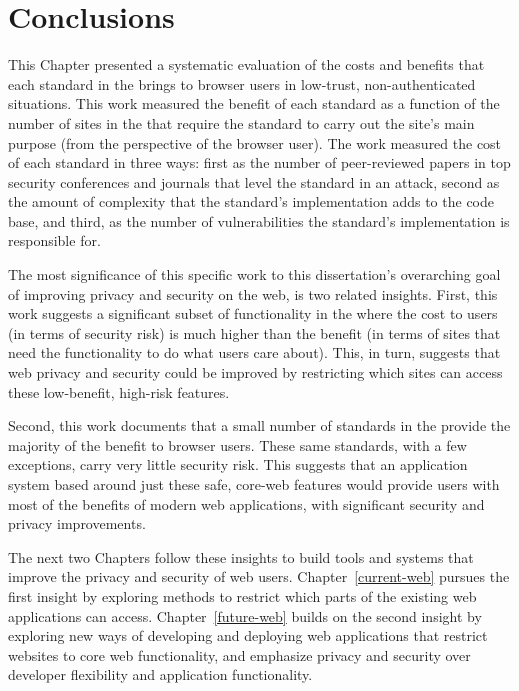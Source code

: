\section{Conclusions}
\label{cost-benefit:conclusions}

This Chapter presented a systematic evaluation of the costs and benefits that
each standard in the \WAPI brings to browser users in low-trust,
non-authenticated situations.  This work measured the benefit of each
standard as a function of the number of sites in the \ATK that require
the standard to carry out the site's main purpose (from the perspective
of the browser user).  The work measured the cost
of each standard in three ways: first as the number of peer-reviewed papers
in top security conferences and journals that level the standard in an attack,
second as the amount of complexity that the standard's implementation adds
to the code base, and third, as the number of vulnerabilities the standard's
implementation is responsible for.

The most significance of this specific work to this dissertation's
overarching goal of improving privacy and security on the web, is two
related insights.  First, this work suggests a significant
subset of functionality in the \WAPI where the cost to users (in terms of
security risk) is much higher than the benefit (in terms of sites that need the
functionality to do what users care about).  This, in turn, suggests that web
privacy and security could be improved by restricting which sites can access
these low-benefit, high-risk features.

Second, this work documents that a small number of standards in the \WAPI
provide the majority of the benefit to browser users.  These same standards,
with a few exceptions, carry very little security risk. This suggests
that an application system based around just these safe, core-web features
would provide users with most of the benefits of modern web applications, with
significant security and privacy improvements.

The next two Chapters follow these insights to build tools and systems that
improve the privacy and security of web users.  Chapter~\ref{current-web}
pursues the first insight by exploring methods to restrict which parts of the
\WAPI existing web applications can access.  Chapter~\ref{future-web}
builds on the second insight by exploring new ways of developing and deploying
web applications that restrict websites to core web functionality, and
emphasize privacy and security over developer flexibility and application
functionality.
